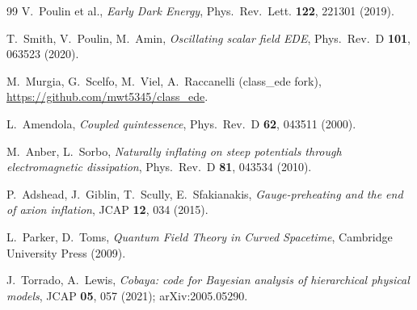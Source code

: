 \documentclass[a4paper,11pt]{article}
\begin{document}
\begin{thebibliography}{99}
 V.~Poulin et al., \textit{Early Dark Energy}, Phys.\ Rev.\ Lett. \textbf{122}, 221301 (2019).

 T.~Smith, V.~Poulin, M.~Amin, \textit{Oscillating scalar field EDE}, Phys.\ Rev.\ D \textbf{101}, 063523 (2020).

 M.~Murgia, G.~Scelfo, M.~Viel, A.~Raccanelli (class\_ede fork), \url{https://github.com/mwt5345/class_ede}.

 L.~Amendola, \textit{Coupled quintessence}, Phys.\ Rev.\ D \textbf{62}, 043511 (2000).

 M.~Anber, L.~Sorbo, \textit{Naturally inflating on steep potentials through electromagnetic dissipation}, Phys.\ Rev.\ D \textbf{81}, 043534 (2010).

 P.~Adshead, J.~Giblin, T.~Scully, E.~Sfakianakis, \textit{Gauge-preheating and the end of axion inflation}, JCAP \textbf{12}, 034 (2015).

 L.~Parker, D.~Toms, \textit{Quantum Field Theory in Curved Spacetime}, Cambridge University Press (2009).

 J.~Torrado, A.~Lewis, \textit{Cobaya: code for Bayesian analysis of hierarchical physical models}, JCAP \textbf{05}, 057 (2021); arXiv:2005.05290.

\end{thebibliography}
\end{document}
